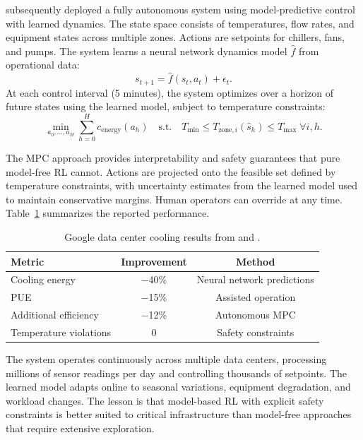 \citet{Lazic2018} subsequently deployed a fully autonomous system using model-predictive control with learned dynamics. The state space consists of temperatures, flow rates, and equipment states across multiple zones. Actions are setpoints for chillers, fans, and pumps. The system learns a neural network dynamics model $\hat{f}$ from operational data:
\begin{equation}
s_{t+1} = \hat{f}(s_t, a_t) + \epsilon_t.
\end{equation}
At each control interval (5 minutes), the system optimizes over a horizon of future states using the learned model, subject to temperature constraints:
\begin{equation}
\min_{a_0, \ldots, a_H} \sum_{h=0}^{H} c_{\text{energy}}(a_h) \quad \text{s.t.} \quad T_{\min} \leq T_{\text{zone},i}(\hat{s}_h) \leq T_{\max} \; \forall i, h.
\end{equation}

The MPC approach provides interpretability and safety guarantees that pure model-free RL cannot. Actions are projected onto the feasible set defined by temperature constraints, with uncertainty estimates from the learned model used to maintain conservative margins. Human operators can override at any time. Table~\ref{tab:datacenter_results} summarizes the reported performance.

\begin{table}[htbp]
\centering
\caption{Google data center cooling results from \citet{Gao2014} and \citet{Lazic2018}.}
\label{tab:datacenter_results}
\begin{tabular}{lcc}
\toprule
Metric & Improvement & Method \\
\midrule
Cooling energy & $-$40\% & Neural network predictions \\
PUE & $-$15\% & Assisted operation \\
Additional efficiency & $-$12\% & Autonomous MPC \\
Temperature violations & 0 & Safety constraints \\
\bottomrule
\end{tabular}
\end{table}

The system operates continuously across multiple data centers, processing millions of sensor readings per day and controlling thousands of setpoints. The learned model adapts online to seasonal variations, equipment degradation, and workload changes. The lesson is that model-based RL with explicit safety constraints is better suited to critical infrastructure than model-free approaches that require extensive exploration.


